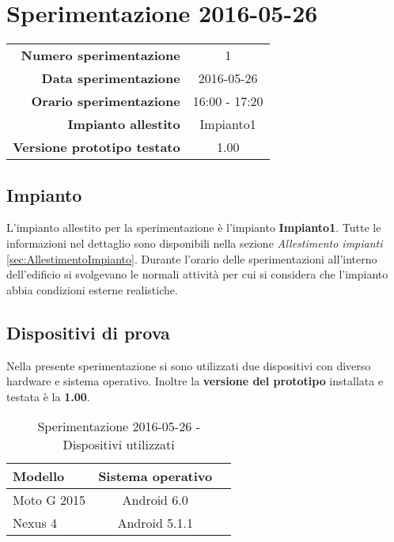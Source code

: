 \documentclass[../Sperimentazione.tex]{subfiles}
\begin{document}
	\section{Sperimentazione 2016-05-26}
	
		\begin{table} [h]
		\centering
		\begin{tabular}[width=0.5\textwidth]{r|c}
			\textbf{Numero sperimentazione} & 1 \\
			\textbf{Data sperimentazione} & 2016-05-26 \\
			\textbf{Orario sperimentazione} & 16:00 - 17:20 \\
			\textbf{Impianto allestito} & Impianto1 \\
			\textbf{Versione prototipo testato} & 1.00 \\		
		\end{tabular}
		\end{table}
	
		
		\subsection{Impianto}
		L'impianto allestito per la sperimentazione è l'impianto \textbf{Impianto1}. Tutte le informazioni nel dettaglio sono disponibili nella sezione \textit{Allestimento impianti} \ref{sec:AllestimentoImpianto}. Durante l'orario delle sperimentazioni all'interno dell'edificio si svolgevano le normali attività per cui si considera che l'impianto abbia condizioni esterne realistiche.


		\subsection{Dispositivi di prova}
			Nella presente sperimentazione si sono utilizzati due dispositivi con diverso hardware e sistema operativo. Inoltre la \textbf{versione del prototipo} installata e testata è la \textbf{1.00}.
	
			\begin{table} [h]
			\centering
				\begin{tabular}{lcc}
					\textbf{Modello} & \textbf{Sistema operativo} \\
					\toprule
					Moto G 2015 & Android 6.0 \\
					\midrule
					Nexus 4 & Android 5.1.1 \\
					\bottomrule
				\end{tabular}
				\caption{Sperimentazione 2016-05-26 - Dispositivi utilizzati}
				\label{tab:Sperimentazione1Dispositivi}
			\end{table}
		
\end{document}
